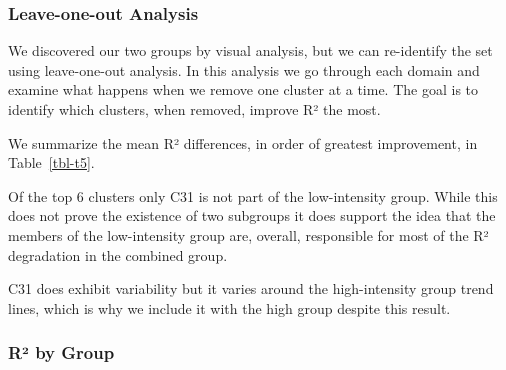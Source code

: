 \documentclass[
  letterpaper,
  DIV=11,
  numbers=noendperiod]{scrartcl}
\begin{document}
\FloatBarrier

\subsubsection*{Leave-one-out Analysis}\label{sec-loo}

We discovered our two groups by visual analysis, but we can re-identify
the set using leave-one-out analysis. In this analysis we go through
each domain and examine what happens when we remove one cluster at a
time. The goal is to identify which clusters, when removed, improve R²
the most.

We summarize the mean R² differences, in order of greatest improvement,
in Table~\ref{tbl-t5}.

\begin{table}[h]

\caption{\label{tbl-t5}Leave-one-out Analysis}


\end{table}%

Of the top 6 clusters only C31 is not part of the low-intensity group.
While this does not prove the existence of two subgroups it does support
the idea that the members of the low-intensity group are, overall,
responsible for most of the R² degradation in the combined group.

C31 does exhibit variability but it varies around the high-intensity
group trend lines, which is why we include it with the high group
despite this result.

\FloatBarrier 
\bigskip

\subsubsection*{R² by Group}\label{sec-r2-group}
\end{document}
